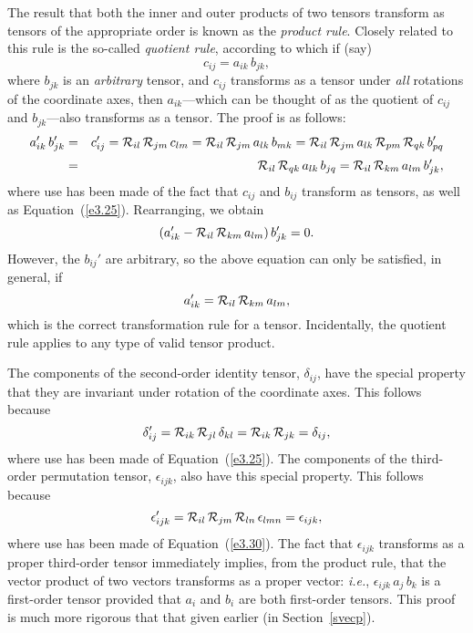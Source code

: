 The result that both the inner and outer products of two tensors transform as  tensors
of the appropriate order is known as the {\em product rule}.
Closely related to this rule is the so-called {\em quotient rule}, according to which 
if (say)
\begin{equation}
c_{ij} = a_{ik}\,b_{jk},
\end{equation}
where $b_{jk}$ is an {\em arbitrary}\/ tensor, 
and $c_{ij}$  transforms as a tensor under {\em all}\/ rotations
of the coordinate axes, then $a_{ik}$---which can be thought of as the quotient of $c_{ij}$ and $b_{jk}$---also transforms as a tensor.
The proof is as follows:
\begin{eqnarray}
a_{ik}'\,b_{jk}'&=&c_{ij}' = {\cal R}_{il}\,{\cal R}_{jm}\,c_{lm}= {\cal R}_{il}\,{\cal R}_{jm}\,a_{lk}\,b_{mk}={\cal R}_{il}\,{\cal R}_{jm}\,a_{lk}\,{\cal R}_{pm}\,{\cal R}_{qk}\,b_{pq}'
\nonumber\\[0.5ex]
&=& {\cal R}_{il}\,{\cal R}_{qk}\,a_{lk}\,b_{jq} = {\cal R}_{il}\,{\cal R}_{km}\,a_{lm}\,b_{jk}',
\end{eqnarray}
where use has been made of the fact that $c_{ij}$ and  $b_{ij}$ transform as tensors, as well as Equation~(\ref{e3.25}).
Rearranging, we obtain
\begin{equation}
(a_{ik}'- {\cal R}_{il}\,{\cal R}_{km}\,a_{lm})\,b_{jk}' = 0.
\end{equation}
However, the $b_{ij}'$ are arbitrary, so the above equation can only be satisfied, in general, if
\begin{equation}
a_{ik}' = {\cal R}_{il}\,{\cal R}_{km}\,a_{lm},
\end{equation}
which is the correct transformation rule for a tensor.
Incidentally, the quotient rule applies to any type of valid tensor product.

The components of the second-order identity tensor, $\delta_{ij}$, have the special property that they
are invariant under rotation of the coordinate axes. This follows because
\begin{equation}
\delta_{ij}' = {\cal R}_{ik}\,{\cal R}_{jl}\,\delta_{kl}= {\cal R}_{ik}\,{\cal R}_{jk} = \delta_{ij},
\end{equation}
where use has been made of Equation~(\ref{e3.25}). The components of the third-order permutation
tensor, $\epsilon_{ijk}$, also have this special property. This follows because
\begin{equation}
\epsilon_{ijk}' = {\cal R}_{il}\,{\cal R}_{jm}\,{\cal R}_{ln}\,\epsilon_{lmn} = \epsilon_{ijk},
\end{equation}
where use has been made of Equation~(\ref{e3.30}). The fact that $\epsilon_{ijk}$ transforms as a proper
third-order tensor immediately implies, from the product rule,
that the vector product of two vectors transforms as a proper vector: {\em i.e.},
$\epsilon_{ijk}\,a_j\,b_k$ is a first-order tensor provided that $a_i$ and $b_i$ are both first-order tensors.
This proof is much more rigorous that that given earlier (in Section~\ref{svecp}).

